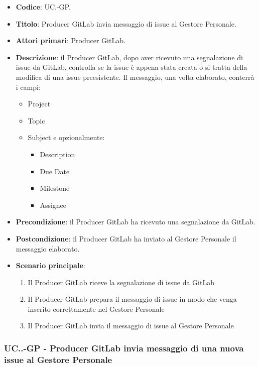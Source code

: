 		\begin{itemize}
			\newpage
			\item \textbf{Codice}: UC\theuccount.\thesubuccount-GP.
			\item \textbf{Titolo}:  Producer GitLab invia messaggio di issue al Gestore Personale.
			\item \textbf{Attori primari}: Producer GitLab.
			\item \textbf{Descrizione}: il Producer GitLab, dopo aver ricevuto una segnalazione di issue da GitLab, controlla se la issue è appena stata creata o si tratta della modifica di una issue preesistente. Il messaggio, una volta elaborato, conterrà i campi:
			\begin{itemize}
				\item Project
				\item Topic
				\item Subject e opzionalmente:
				\begin{itemize}
					\item Description
					\item Due Date
					\item Milestone
					\item Assignee
				\end{itemize}
			\end{itemize}
			\item \textbf{Precondizione}: il Producer GitLab ha ricevuto una segnalazione da GitLab.
			\item \textbf{Postcondizione}: il Producer GitLab ha inviato al Gestore Personale il messaggio  \newline elaborato.
			\item \textbf{Scenario principale}: 
			\begin{enumerate}
				\item Il Producer GitLab riceve la segnalazione di issue da GitLab
				\item Il Producer GitLab prepara il messaggio di issue in modo che venga inserito  \newline correttamente nel Gestore Personale
				\item Il Producer GitLab invia il messaggio di issue al Gestore Personale
			\end{enumerate}
			
		\end{itemize}
		
		\subsubsection{UC\theuccount.\thesubuccount.\thesubsubuccount-GP - Producer GitLab invia messaggio di una nuova issue al Gestore Personale}
			
